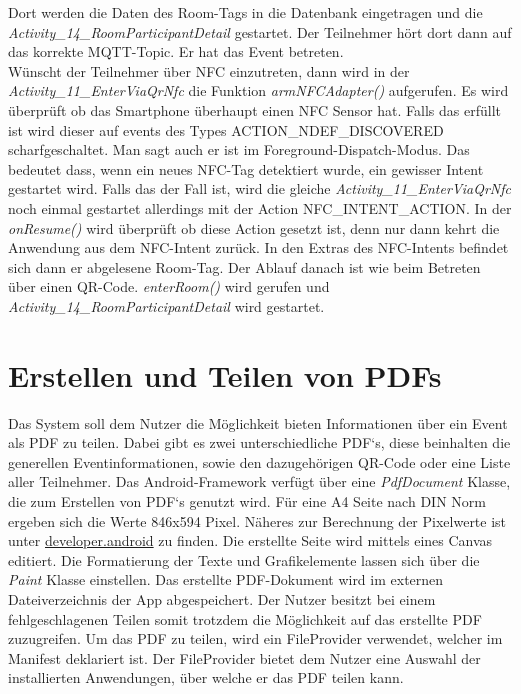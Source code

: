 Dort werden die Daten des Room-Tags in die Datenbank eingetragen und die \textit{Activity\_14\_RoomParticipantDetail} gestartet. Der Teilnehmer hört dort dann auf das korrekte MQTT-Topic. Er hat das Event betreten.\\
Wünscht der Teilnehmer über NFC einzutreten, dann wird in der \textit{Activity\_11\_EnterViaQrNfc} die Funktion \textit{armNFCAdapter()} aufgerufen. Es wird überprüft ob das Smartphone überhaupt einen NFC Sensor hat.
Falls das erfüllt ist wird dieser auf events des Types ACTION\_NDEF\_DISCOVERED scharfgeschaltet. 
Man sagt auch er ist im Foreground-Dispatch-Modus.
Das bedeutet dass, wenn ein neues NFC-Tag detektiert wurde, ein gewisser Intent gestartet wird. 
Falls das der Fall ist, wird die gleiche \textit{Activity\_11\_EnterViaQrNfc} noch einmal gestartet allerdings mit der Action NFC\_INTENT\_ACTION. 
In der \textit{onResume()} wird überprüft ob diese Action gesetzt ist, denn nur dann kehrt die Anwendung aus dem NFC-Intent zurück.
In den Extras des NFC-Intents befindet sich dann er abgelesene Room-Tag. Der Ablauf danach ist wie beim Betreten über einen QR-Code. \textit{enterRoom()} wird gerufen und \textit{Activity\_14\_RoomParticipantDetail} wird gestartet.




\section{Erstellen und Teilen von PDFs}
\label{sec:PDF}
Das System soll dem Nutzer die Möglichkeit bieten Informationen über ein Event als PDF zu teilen. 
Dabei gibt es zwei unterschiedliche PDF‘s, diese beinhalten die generellen Eventinformationen, sowie den dazugehörigen QR-Code oder eine Liste aller Teilnehmer.
Das Android-Framework  verfügt über eine \textit{PdfDocument} Klasse, die zum Erstellen von PDF‘s genutzt wird. 
Für eine A4 Seite nach DIN Norm ergeben sich die Werte 846x594 Pixel. Näheres zur Berechnung der Pixelwerte ist unter \href{https://developer.android.com/reference/android/graphics/pdf/PdfDocument.PageInfo}{developer.android} zu finden. 
Die erstellte Seite wird mittels eines Canvas editiert. 
Die Formatierung  der Texte und Grafikelemente lassen sich über die \textit{Paint} Klasse einstellen.
Das erstellte PDF-Dokument wird im externen Dateiverzeichnis der App abgespeichert. Der Nutzer besitzt bei einem fehlgeschlagenen Teilen somit trotzdem die Möglichkeit auf das erstellte PDF zuzugreifen.
Um das PDF zu teilen, wird ein FileProvider verwendet, welcher im Manifest deklariert ist.  Der FileProvider bietet dem Nutzer eine Auswahl der installierten Anwendungen, über welche er das PDF teilen kann.



